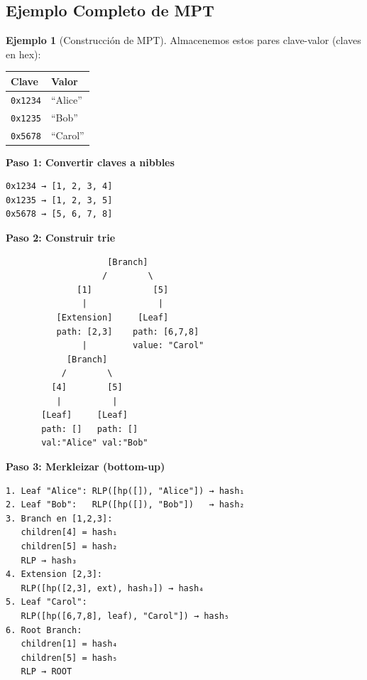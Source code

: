 \documentclass[11pt,a4paper,twoside,openright]{book}
\theoremstyle{definition}
\newtheorem{example}{Ejemplo}[chapter]
\theoremstyle{plain}
\theoremstyle{remark}
\begin{document}
\subsection{Ejemplo Completo de MPT}

\begin{example}[Construcción de MPT]
Almacenemos estos pares clave-valor (claves en hex):

\begin{center}
\begin{tabular}{ll}
\toprule
\textbf{Clave} & \textbf{Valor} \\
\midrule
\texttt{0x1234} & ``Alice'' \\
\texttt{0x1235} & ``Bob'' \\
\texttt{0x5678} & ``Carol'' \\
\bottomrule
\end{tabular}
\end{center}

\textbf{Paso 1: Convertir claves a nibbles}
\begin{verbatim}
0x1234 → [1, 2, 3, 4]
0x1235 → [1, 2, 3, 5]
0x5678 → [5, 6, 7, 8]
\end{verbatim}

\textbf{Paso 2: Construir trie}

\begin{verbatim}
                    [Branch]
                   /        \
              [1]            [5]
               |              |
          [Extension]     [Leaf]
          path: [2,3]    path: [6,7,8]
               |         value: "Carol"
            [Branch]
           /        \
         [4]        [5]
          |          |
       [Leaf]     [Leaf]
       path: []   path: []
       val:"Alice" val:"Bob"
\end{verbatim}

\textbf{Paso 3: Merkleizar (bottom-up)}

\begin{verbatim}
1. Leaf "Alice": RLP([hp([]), "Alice"]) → hash₁
2. Leaf "Bob":   RLP([hp([]), "Bob"])   → hash₂
3. Branch en [1,2,3]:
   children[4] = hash₁
   children[5] = hash₂
   RLP → hash₃
4. Extension [2,3]:
   RLP([hp([2,3], ext), hash₃]) → hash₄
5. Leaf "Carol":
   RLP([hp([6,7,8], leaf), "Carol"]) → hash₅
6. Root Branch:
   children[1] = hash₄
   children[5] = hash₅
   RLP → ROOT
\end{verbatim}
\end{example}

\end{document}
